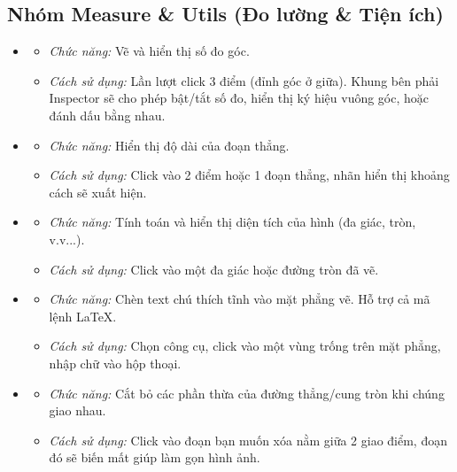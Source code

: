 \documentclass[12pt,a4paper]{article}
\begin{document}
\subsection{Nhóm Measure \& Utils (Đo lường \& Tiện ích)}
\begin{itemize}[label=\textcolor{primary}{\faDraftingCompass}]
    \item {}
    \begin{itemize}
        \item \textit{Chức năng:} Vẽ và hiển thị số đo góc.
        \item \textit{Cách sử dụng:} Lần lượt click 3 điểm (đỉnh góc ở giữa). Khung bên phải Inspector sẽ cho phép bật/tắt số đo, hiển thị ký hiệu vuông góc, hoặc đánh dấu bằng nhau.
    \end{itemize}

    \item {}
    \begin{itemize}
        \item \textit{Chức năng:} Hiển thị độ dài của đoạn thẳng.
        \item \textit{Cách sử dụng:} Click vào 2 điểm hoặc 1 đoạn thẳng, nhãn hiển thị khoảng cách sẽ xuất hiện.
    \end{itemize}
    
    \item {}
    \begin{itemize}
        \item \textit{Chức năng:} Tính toán và hiển thị diện tích của hình (đa giác, tròn, v.v...).
        \item \textit{Cách sử dụng:} Click vào một đa giác hoặc đường tròn đã vẽ.
    \end{itemize}

    \item {}
    \begin{itemize}
        \item \textit{Chức năng:} Chèn text chú thích tĩnh vào mặt phẳng vẽ. Hỗ trợ cả mã lệnh LaTeX.
        \item \textit{Cách sử dụng:} Chọn công cụ, click vào một vùng trống trên mặt phẳng, nhập chữ vào hộp thoại.
    \end{itemize}

    \item {}
    \begin{itemize}
        \item \textit{Chức năng:} Cắt bỏ các phần thừa của đường thẳng/cung tròn khi chúng giao nhau.
        \item \textit{Cách sử dụng:} Click vào đoạn bạn muốn xóa nằm giữa 2 giao điểm, đoạn đó sẽ biến mất giúp làm gọn hình ảnh.
    \end{itemize}


\end{itemize}
\end{document}
